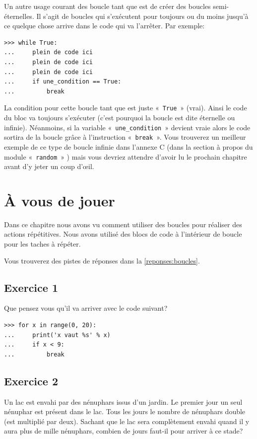 Un autre usage courant des boucle tant que est de créer des boucles semi-éternelles. 
Il s'agit de boucles qui s'exécutent pour toujours ou du moins jusqu'à ce quelque chose arrive dans le code qui va l'arrêter. Par exemple:

\begin{Verbatim}[frame=single,rulecolor=\color{gray}, label=ne pas saisir]
>>> while True:
...     plein de code ici
...     plein de code ici
...     plein de code ici
...     if une_condition == True:
...         break
\end{Verbatim}

La condition pour cette boucle tant que est juste «~\texttt{True}~» (vrai). Ainsi le code du bloc va toujours s'exécuter (c'est pourquoi la boucle est dite éternelle ou infinie). Néanmoins, si la variable «~\texttt{une\_condition}~»   devient vraie alors le code sortira de la boucle grâce à l'instruction «~\texttt{break}~». Vous trouverez un meilleur exemple de ce type de boucle infinie dans l'annexe C (dans la section à propos du module «~\texttt{random}~»  ) mais vous devriez attendre d'avoir lu le prochain chapitre avant d'y jeter un coup d'œil.

\section{À vous de jouer\label{pratique:boucles}}
Dans ce chapitre nous avons vu comment utiliser des boucles pour réaliser des actions répétitives. Nous avons utilisé des blocs de code à l'intérieur de boucle pour les taches à répéter.


Vous trouverez des pistes de réponses dans la \autoref{reponses:boucles}.
\subsection{Exercice 1}
Que pensez vous qu'il va arriver avec le code suivant?
\begin{Verbatim}[frame=single,rulecolor=\color{mbleu}, label=à taper]
>>> for x in range(0, 20):
... 	print('x vaut %s' % x)
... 	if x < 9:
... 		break
\end{Verbatim}

\subsection{Exercice 2}
Un lac est envahi par des nénuphars issus d'un jardin. Le premier jour un seul nénuphar est présent dans le lac.
Tous les jours le nombre de nénuphars double (est multiplié par deux). 
Sachant que le lac sera complètement envahi quand il y aura plus de mille nénuphars, combien de jours faut-il pour arriver à ce stade?

